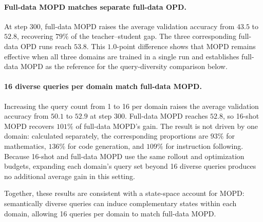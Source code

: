 \paragraph{Full-data MOPD matches separate full-data OPD.}
At step \(300\), full-data MOPD raises the average validation accuracy from \(43.5\) to \(52.8\), recovering \(79\%\) of the teacher--student gap. The three corresponding full-data OPD runs reach \(53.8\). This \(1.0\)-point difference shows that MOPD remains effective when all three domains are trained in a single run and establishes full-data MOPD as the reference for the query-diversity comparison below.

\paragraph{16 diverse queries per domain match full-data MOPD.}
Increasing the query count from 1 to 16 per domain raises the average validation accuracy from \(50.1\) to \(52.9\) at step \(300\). Full-data MOPD reaches \(52.8\), so 16-shot MOPD recovers \(101\%\) of full-data MOPD's gain. The result is not driven by one domain: calculated separately, the corresponding proportions are \(93\%\) for mathematics, \(136\%\) for code generation, and \(109\%\) for instruction following. Because 16-shot and full-data MOPD use the same rollout and optimization budgets, expanding each domain's query set beyond 16 diverse queries produces no additional average gain in this setting.

Together, these results are consistent with a state-space account for MOPD: semantically diverse queries can induce complementary states within each domain, allowing 16 queries per domain to match full-data MOPD.


